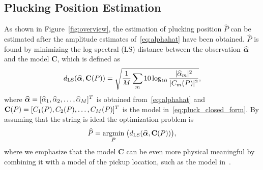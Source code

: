 \documentclass{article}
\begin{document}
\subsection{Plucking Position Estimation} %
\label{sec:proposed_estimation_of_pluck_amplitude}
\vspace{-.6mm}
As shown in Figure~\ref{fig:overview}, the estimation of plucking position $\widehat{P}$ can be estimated after the amplitude estimates of~\eqref{eq:alphahat} have been obtained. $\widehat{P}$ is found by minimizing the log spectral (LS) distance between the observation $\text{\boldmath${\widehat\alpha}$}$ and the model $\mathbf{C}$, which is defined as
\begin{equation}
    d_{\textup{LS}}(\text{\boldmath${\widehat\alpha}$},\mathbf{C}(P)) = \sqrt{ \frac{1}{M} \sum_m 10\log_{10} \frac{\lvert\widehat{\alpha}_m\rvert^2}{\lvert C_m(P)\rvert^2} },   
\end{equation} 
where $\text{\boldmath${\widehat\alpha}$} = [\widehat{\alpha}_1,\widehat{\alpha}_2,\dots,\widehat{\alpha}_M]^T$ is obtained from~\eqref{eq:alphahat} and $\mathbf{C}(P) = \newline[C_1(P),C_2(P),\dots,C_M(P)]^T$ is the model in~\eqref{eq:pluck_closed_form}. By assuming that the string is ideal the optimization problem is
\begin{equation}
    \widehat{P} = \underset{P}{\operatorname{argmin}}\;{\big(d_{\textup{LS}}(\text{\boldmath${\widehat\alpha}$},\mathbf{C}(P))\big)},
\end{equation}
where we emphasize that the model $\mathbf{C}$ can be even more physical meaningful by combining it with a model of the pickup location, such as the model in~\cite{DBLP:conf/icassp/MohamadDH17}.\vspace{-2mm}
%
%
%
%
\end{document}
